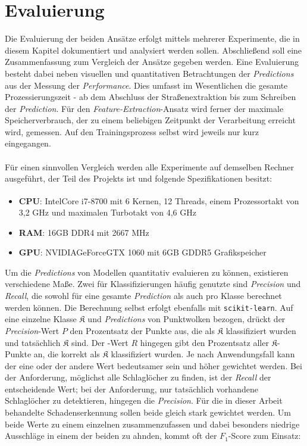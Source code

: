 
\chapter{Evaluierung}
\label{chap:eval}

Die Evaluierung der beiden Ansätze erfolgt mittels mehrerer Experimente, die in diesem Kapitel dokumentiert und analysiert werden sollen. Abschließend soll eine Zusammenfassung zum Vergleich der Ansätze gegeben werden. Eine Evaluierung besteht dabei neben visuellen und quantitativen Betrachtungen der \textit{Predictions} aus der Messung der \textit{Performance}. Dies umfasst im Wesentlichen die gesamte Prozessierungszeit - ab dem Abschluss der Straßenextraktion bis zum Schreiben der \textit{Prediction}. Für den \textit{Feature-Extraction}-Ansatz wird ferner der maximale Speicherverbrauch, der zu einem beliebigen Zeitpunkt der Verarbeitung erreicht wird, gemessen. Auf den Trainingsprozess selbst wird jeweils nur kurz eingegangen. \\\\
Für einen sinnvollen Vergleich werden alle Experimente auf demselben Rechner ausgeführt, der Teil des Projekts ist und folgende Spezifikationen besitzt:
\begin{itemize}
    \item \textbf{CPU}: Intel\textregistered Core\textsuperscript{\texttrademark} i7-8700 mit 6 Kernen, 12 Threads, einem Prozessortakt von 3,2 GHz und maximalen Turbotakt von 4,6 GHz
    \item \textbf{RAM}: 16GB DDR4 mit 2667 MHz
    \item \textbf{GPU}: NVIDIA\textregistered GeForce\textregistered GTX 1060 mit 6GB GDDR5 Grafikspeicher
\end{itemize}
Um die \textit{Predictions} von Modellen quantitativ evaluieren zu können, existieren verschiedene Maße. Zwei für Klassifizierungen häufig genutzte \citep{Li.Cheng-2018, Zaboli.etal-2019} sind \textit{Precision} und \textit{Recall}, die sowohl für eine gesamte \textit{Prediction} als auch pro Klasse berechnet werden können. Die Berechnung selbst erfolgt ebenfalls mit \texttt{scikit-learn}. Auf eine einzelne Klasse $\mathfrak{K}$ und \textit{Predictions} von Punktwolken bezogen, drückt der \textit{Precision}-Wert $P$ den Prozentsatz der Punkte aus, die als $\mathfrak{K}$ klassifiziert wurden und tatsächlich $\mathfrak{K}$ sind. Der -Wert $R$ hingegen gibt den Prozentsatz aller $\mathfrak{K}$-Punkte an, die korrekt als $\mathfrak{K}$ klassifiziert wurden. Je nach Anwendungsfall kann der eine oder der andere Wert bedeutsamer sein und höher gewichtet werden. Bei der Anforderung, möglichst alle Schlaglöcher zu finden, ist der \textit{Recall} der entscheidende Wert; bei der Anforderung, nur tatsächlich vorhandene Schlaglöcher zu detektieren, hingegen die \textit{Precision}. Für die in dieser Arbeit behandelte Schadenserkennung sollen beide gleich stark gewichtet werden. Um beide Werte zu einem einzelnen zusammenzufassen und dabei besonders niedrige Ausschläge in einem der beiden zu ahnden, kommt oft der $F_1$-Score zum Einsatz:
